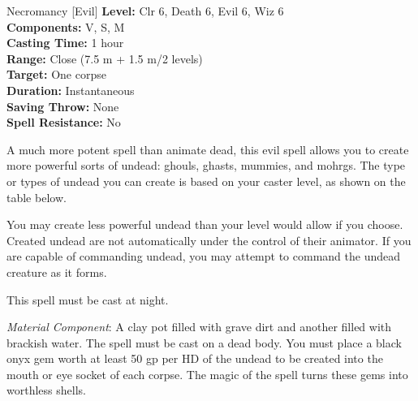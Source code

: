 {Necromancy [Evil]}
{
	\textbf{Level:}
	Clr 6, Death 6, Evil 6, Wiz 6\\
	\textbf{Components:}
	V, S, M\\
	\textbf{Casting Time:}
	1 hour\\
	\textbf{Range:}
	Close (7.5 m + 1.5 m/2 levels)\\
	\textbf{Target:}
	One corpse\\
	\textbf{Duration:}
	Instantaneous\\
	\textbf{Saving Throw:}
	None\\
	\textbf{Spell Resistance:}
	No\\
}
{
	A much more potent spell than animate dead, this evil spell allows you to create more powerful sorts of undead: ghouls, ghasts, mummies, and mohrgs. The type or types of undead you can create is based on your caster level, as shown on the table below.

	You may create less powerful undead than your level would allow if you choose. Created undead are not automatically under the control of their animator. If you are capable of commanding undead, you may attempt to command the undead creature as it forms.

	This spell must be cast at night.

	\textit{Material Component}:
	A clay pot filled with grave dirt and another filled with brackish water. The spell must be cast on a dead body. You must place a black onyx gem worth at least 50 gp per HD of the undead to be created into the mouth or eye socket of each corpse. The magic of the spell turns these gems into worthless shells.

}
